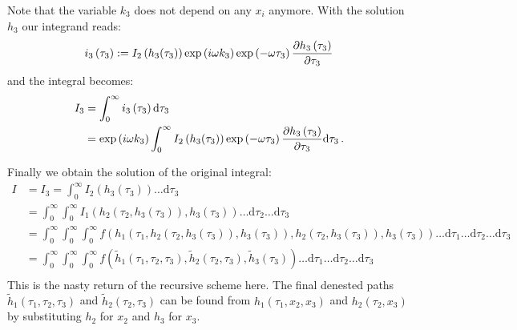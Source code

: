\documentclass[a4paper,10pt]{article}
\begin{document}
Note that the variable $k_3$ does not depend on any $x_i$ anymore.
With the solution $h_3$ our integrand reads:
\begin{equation}
 i_3\left(\tau_3\right) := I_2\left(h_3(\tau_3)\right) \exp\left(i \omega k_3 \right)
                           \exp\left(- \omega \tau_3 \right) \frac{\partial h_3\left(\tau_3\right)}{\partial \tau_3}
\end{equation}
and the integral becomes:
\begin{equation}
\begin{split}
  I_3 & = \int_0^{\infty} i_3\left(\tau_3\right) \mathrm{d}\tau_3 \\
      & = \exp\left(i \omega k_3\right)
          \int_0^{\infty} I_2\left(h_3(\tau_3)\right)
                          \exp\left(- \omega \tau_3 \right)
                          \frac{\partial h_3\left(\tau_3\right)}{\partial \tau_3}
          \mathrm{d}\tau_3 \,.
\end{split}
\end{equation}

Finally we obtain the solution of the original integral:
\begin{equation*}
\begin{split}
  I & = I_3 = \int_0^{\infty} I_2\left(h_3(\tau_3)\right) \ldots \mathrm{d}\tau_3 \\
    & = \int_0^{\infty}
          \int_0^{\infty} I_1\left(h_2(\tau_2, h_3(\tau_3)), h_3(\tau_3)\right)
          \ldots \mathrm{d}\tau_2
        \ldots \mathrm{d}\tau_3 \\
    & = \int_0^{\infty}
          \int_0^{\infty}
            \int_0^{\infty} f\left(h_1(\tau_1, h_2(\tau_2, h_3(\tau_3)), h_3(\tau_3)),
                                   h_2(\tau_2, h_3(\tau_3)),
                                   h_3(\tau_3)
                             \right)
            \ldots \mathrm{d}\tau_1
          \ldots \mathrm{d}\tau_2
        \ldots \mathrm{d}\tau_3 \\
    & = \int_0^{\infty}
          \int_0^{\infty}
            \int_0^{\infty} f\left(\tilde{h}_1(\tau_1, \tau_2, \tau_3),
                                   \tilde{h}_2(\tau_2, \tau_3),
                                   \tilde{h}_3(\tau_3)
                             \right)
            \ldots \mathrm{d}\tau_1
          \ldots \mathrm{d}\tau_2
        \ldots \mathrm{d}\tau_3 \\
\end{split}
\end{equation*}
This is the nasty return of the recursive scheme here.
The final denested paths $\tilde{h}_1\left(\tau_1, \tau_2, \tau_3\right)$ and
$\tilde{h}_2\left(\tau_2, \tau_3\right)$ can be found from
$h_1\left(\tau_1, x_2, x_3\right)$ and $h_2\left(\tau_2, x_3\right)$
by substituting $h_2$ for $x_2$ and $h_3$ for $x_3$.
\end{document}
